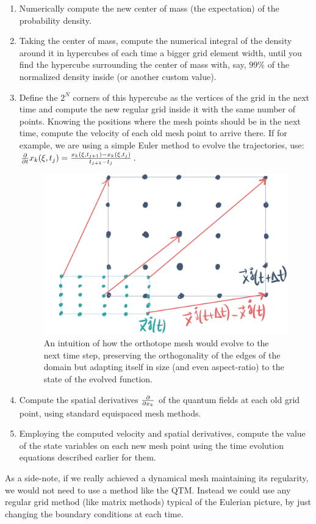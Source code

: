 \documentclass[11pt, a4paper]{article} %
\begin{document}
\begin{enumerate}
\item Numerically compute the new center of mass (the expectation) of the probability density.
\item Taking the center of mass, compute the numerical integral of the density around it in hypercubes of each time a bigger grid element width, until you find the hypercube surrounding the center of mass with, say, $99\%$ of the normalized density inside (or another custom value).
\item Define the $2^N$ corners of this hypercube as the vertices of the grid in the next time and compute the new regular grid inside it with the same number of points. Knowing the positions where the mesh points should be in the next time, compute the velocity of each old mesh point to arrive there. If for example, we are using a simple Euler method to evolve the trajectories, use: $\pdv{}{t}x_k(\xi,t_{j})=\frac{x_k(\xi,t_{j+1})-x_k(\xi,t_{j})}{t_{j+1}-t_j}$.
\begin{figure}[h!]
  \centering
    \includegraphics[width=0.45\linewidth]{9orthotope.png}
  \caption{ An intuition of how the orthotope mesh would evolve to the next time step, preserving the orthogonality of the edges of the domain but adapting itself in size (and even aspect-ratio) to the state of the evolved function. \vspace{-0.2cm}}
  \label{fig:ortho}
\end{figure}
\item Compute the spatial derivatives $\pdv{}{x_k}$ of the quantum fields at each old grid point, using standard equispaced mesh methods.
\item Employing the computed velocity and spatial derivatives, compute the value of the state variables on each new mesh point using the time evolution equations described earlier for them.
\end{enumerate}

As a side-note, if we really achieved a dynamical mesh maintaining its regularity, we would not need to use a method like the QTM. Instead we could use any regular grid method (like matrix methods) typical of the Eulerian picture, by just changing the boundary conditions at each time.
\end{document}
